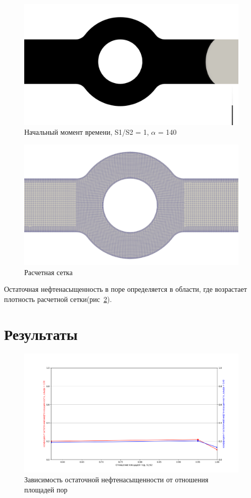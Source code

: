 \documentclass[14pt,a4paper]{article}
\begin{document}
    \begin{figure}[H]
        \centering
        \includegraphics[width = 1\linewidth]{zeroTimeCondition}
        \caption{Начальный момент времени, S1/S2 = 1, $\alpha$ = 140\textdegree}
        \label{fig:zeroTime}
    \end{figure}
     
     \begin{figure}[H]
         \centering
         \includegraphics[width = 0.7\linewidth]{mesh}
         \caption{Расчетная сетка}
         \label{fig:mesh}
     \end{figure}
     
     Остаточная нефтенасыщенность в поре определяется в области, где возрастает плотность расчетной сетки(рис~\ref{fig:mesh}).
   
    \section*{Результаты}
    
    \begin{figure}[H]
        \centering
        \includegraphics[width = 1\linewidth]{oil}
        \caption{Зависимость остаточной нефтенасыщенности от отношения площадей пор}
        \label{fig:oil}
    \end{figure}
    
\end{document}
